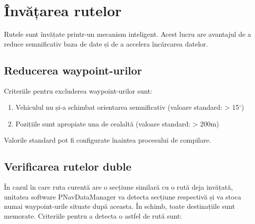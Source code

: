 \label{cap5}


\label{Chapter5} %

\thispagestyle{fancy}


\section{Învățarea rutelor} 
Rutele sunt învățate printr-un mecanism inteligent. Acest lucru are avantajul de a reduce semnificativ baza de date și de a accelera încărcarea datelor.

	\subsection{Reducerea waypoint-urilor} 
	Criteriile pentru excluderea waypoint-urilor sunt:
	\begin{enumerate}
	 \setlength\itemsep{0em}
		\item Vehiculul nu și-a schimbat orientarea semnificativ (valoare standard: > 15$^{\circ}$)
		\item Pozițiile sunt apropiate una de cealaltă (valoare standard: > 200m)
	\end{enumerate}
	
	Valorile standard pot fi configurate  înaintea procesului de compilare.
	
	
	\subsection{Verificarea rutelor duble} 
	În cazul în care ruta curentă are o secțiune similară cu o rută deja invățată, unitatea software PNavDataManager va detecta secțiune respectivă și va stoca numai waypoint-urile situate după aceasta. În schimb, toate destinațiile sunt memorate. Criteriile pentru a detecta o astfel de rută sunt:
	
